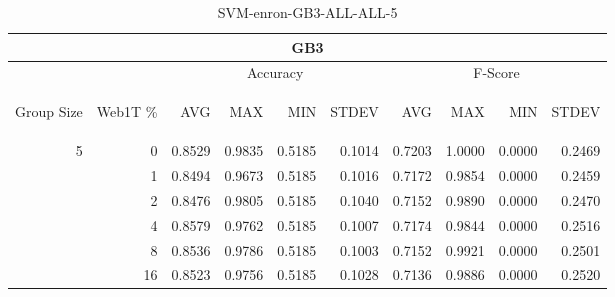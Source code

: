\begin{center}
\begin{table}[htbp] 
 \begin{center}
\begin{tabular}{ | r | r | r | r | r | r | r | r | r | r |}
\hline
\multicolumn{10}{|c|}{GB3}\\
\hline
 & & \multicolumn{4}{|c|}{Accuracy} & \multicolumn{4}{|c|}{F-Score}\\ \cline{3-10}
\begin{sideways}Group Size\end{sideways} & \begin{sideways}Web1T \%\end{sideways} & \begin{sideways}AVG\end{sideways} & \begin{sideways}MAX\end{sideways} & \begin{sideways}MIN\end{sideways} & \begin{sideways}STDEV\end{sideways} & \begin{sideways}AVG\end{sideways} & \begin{sideways}MAX\end{sideways} & \begin{sideways}MIN\end{sideways} & \begin{sideways}STDEV\end{sideways}\\
\hline
\multirow{5}{*}{5}
 & 0 & 0.8529 & 0.9835 & 0.5185 & 0.1014 & 0.7203 & 1.0000 & 0.0000 & 0.2469\\ \cline{2-10}
 & 1 & 0.8494 & 0.9673 & 0.5185 & 0.1016 & 0.7172 & 0.9854 & 0.0000 & 0.2459\\ \cline{2-10}
 & 2 & 0.8476 & 0.9805 & 0.5185 & 0.1040 & 0.7152 & 0.9890 & 0.0000 & 0.2470\\ \cline{2-10}
 & 4 & 0.8579 & 0.9762 & 0.5185 & 0.1007 & 0.7174 & 0.9844 & 0.0000 & 0.2516\\ \cline{2-10}
 & 8 & 0.8536 & 0.9786 & 0.5185 & 0.1003 & 0.7152 & 0.9921 & 0.0000 & 0.2501\\ \cline{2-10}
 & 16 & 0.8523 & 0.9756 & 0.5185 & 0.1028 & 0.7136 & 0.9886 & 0.0000 & 0.2520\\ \cline{2-10}
\hline
\end{tabular}
\caption{SVM-enron-GB3-ALL-ALL-5}
\label{table:SVM-enron-GB3-ALL-ALL-5}
\end{center}
 \end{table}
\end{center}

